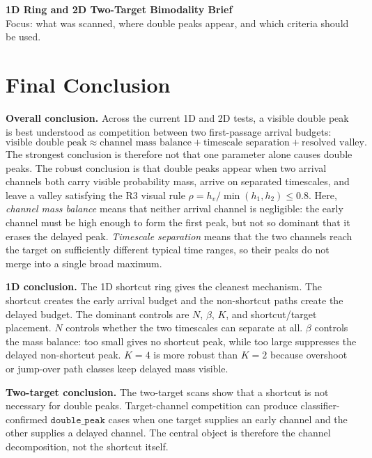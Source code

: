 \documentclass[11pt]{article}
\begin{document}
\begin{center}
{\Large\bfseries 1D Ring and 2D Two-Target Bimodality Brief}\\[0.35em]
{\normalsize Focus: what was scanned, where double peaks appear, and which criteria should be used.}
\end{center}

\section*{Final Conclusion}

\textbf{Overall conclusion.}
Across the current 1D and 2D tests, a visible double peak is best understood
as competition between two first-passage arrival budgets:
\[
  \text{visible double peak}
  \approx
  \text{channel mass balance}
  + \text{timescale separation}
  + \text{resolved valley}.
\]
The strongest conclusion is therefore not that one parameter alone causes
double peaks. The robust conclusion is that double peaks appear when two
arrival channels both carry visible probability mass, arrive on separated
timescales, and leave a valley satisfying the R3 visual rule
\(\rho=h_v/\min(h_1,h_2)\le0.8\).
Here, \emph{channel mass balance} means that neither arrival channel is
negligible: the early channel must be high enough to form the first peak, but
not so dominant that it erases the delayed peak. \emph{Timescale separation}
means that the two channels reach the target on sufficiently different
typical time ranges, so their peaks do not merge into a single broad maximum.

\textbf{1D conclusion.}
The 1D shortcut ring gives the cleanest mechanism. The shortcut creates the
early arrival budget and the non-shortcut paths create the delayed budget.
The dominant controls are \(N\), \(\beta\), \(K\), and shortcut/target
placement. \(N\) controls whether the two timescales can separate at all.
\(\beta\) controls the mass balance: too small gives no shortcut peak, while
too large suppresses the delayed non-shortcut peak. \(K=4\) is more robust
than \(K=2\) because overshoot or jump-over path classes keep delayed mass
visible.

\textbf{Two-target conclusion.}
The two-target scans show that a shortcut is not necessary for double peaks.
Target-channel competition can produce classifier-confirmed
\(\texttt{double\_peak}\) cases when one target supplies an early channel and
the other supplies a delayed channel. The central object is therefore the
channel decomposition, not the shortcut itself.
\end{document}
